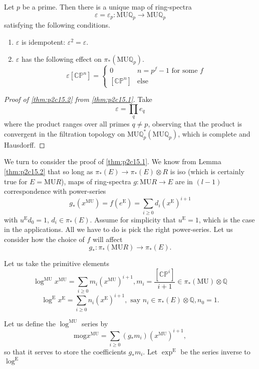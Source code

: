 \documentclass[../main]{subfiles}
\begin{document}
\begin{theorem}
\label{thm:p2c15.2}
Let $p$ be a prime. Then there is a unique map of ring-spectra $$\varepsilon=\varepsilon_p:\mathrm{MU}\mathbb{Q}_p\to\mathrm{MU}\mathbb{Q}_p$$ satisfying the following conditions.
\begin{enumerate}
    \item $\varepsilon$ is idempotent: $\varepsilon^2=\varepsilon$.
    \item $\varepsilon$ has the following effect on $\pi_\ast(\mathrm{MU}\mathbb{Q}_p)$. 
    $$\varepsilon[\mathbb{CP}^n]=
        \begin{cases}
            0 & n=p^f-1\text{ for some }f\\
            [\mathbb{CP}^n] & \mathrm{else}
        \end{cases}$$
\end{enumerate}
\end{theorem}  

\begin{proof}[Proof of \eqref{thm:p2c15.2} from \eqref{thm:p2c15.1}]
Take $$\varepsilon=\prod_qe_q$$ where the product ranges over all primes $q\neq p$, observing that the product is convergent in the filtration topology on $\mathrm{MU}\mathbb{Q}_p^\ast(\mathrm{MU}\mathbb{Q}_p)$, which is complete and Hausdorff.
\end{proof}

We turn to consider the proof of \eqref{thm:p2c15.1}. We know from Lemma \eqref{thm:p2c15.2} that so long as $\pi_\ast(E)\longrightarrow\pi_\ast(E)\otimes R$ is iso (which is certainly true
for $E = \mathrm{MU}R$), maps of ring-spectra $g:\mathrm{MU}R\longrightarrow E$ are in $(l-1)$ correspondence with power-series $$g_\ast(x^{\mathrm{MU}})=f(e^\mathrm{E})=\sum_{i\geq0}d_i(x^{\mathrm{E}})^{i+1}$$ with $u^{\mathrm{E}}d_0=1$, $d_i\in\pi_\ast(E)$. Assume for simplicity that $u^{\mathrm{E}} = 1$, which is the case in the applications. All we have to do is pick the right power-series. Let us consider how the choice of $f$ will affect $$g_\ast:\pi_\ast(\mathrm{MU}R)\longrightarrow\pi_\ast(E).$$

Let us take the primitive elements
$$\log^{\mathrm{MU}}x^{\mathrm{MU}}=\sum_{i\geq0}m_i(x^{\mathrm{MU}})^{i+1}, m_i=\frac{[\mathbb{CP}^i]}{i+1}\in\pi_\ast(\mathrm{MU})\otimes\mathbb{Q}$$
$$\log^{\mathrm{E}}x^{\mathrm{E}}=\sum_{i\geq0}n_i(x^{\mathrm{E}})^{i+1},\text{ say }n_i\in\pi_\ast(E)\otimes\mathbb{Q},n_0=1.$$

Let us define the $\log^{\mathrm{MU}}$ series by $$\mathrm{mog}x^{\mathrm{MU}}=\sum_{i\geq0}(g_\ast m_i)(x^{\mathrm{MU}})^{i+1},$$ so that it serves to store the coefficients $g_\ast m_i$. Let $\exp^{\mathrm{E}}$ be the series inverse to $\log^{\mathrm{E}}$
\end{document}
